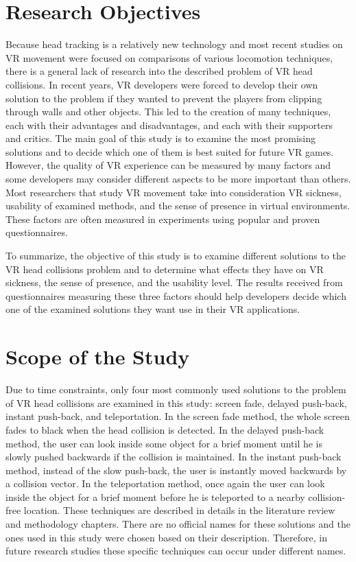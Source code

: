 \section{Research Objectives}

Because head tracking is a relatively new technology and most recent studies on VR movement were focused on comparisons of various locomotion techniques, there is a general lack of research into the described problem of VR head collisions. In recent years, VR developers were forced to develop their own solution to the problem if they wanted to prevent the players from clipping through walls and other objects. This led to the creation of many techniques, each with their advantages and disadvantages, and each with their supporters and critics. The main goal of this study is to examine the most promising solutions and to decide which one of them is best suited for future VR games. However, the quality of VR experience can be measured by many factors and some developers may consider different aspects to be more important than others. Most researchers that study VR movement take into consideration VR sickness, usability of examined methods, and the sense of presence in virtual environments. These factors are often measured in experiments using popular and proven questionnaires. 

To summarize, the objective of this study is to examine different solutions to the VR head collisions problem and to determine what effects they have on VR sickness, the sense of presence, and the usability level. The results received from questionnaires measuring these three factors should help developers decide which one of the examined solutions they want use in their VR applications.

\section{Scope of the Study}

Due to time constraints, only four most commonly used solutions to the problem of VR head collisions are examined in this study: screen fade, delayed push-back, instant push-back, and teleportation. In the screen fade method, the whole screen fades to black when the head collision is detected. In the delayed push-back method, the user can look inside some object for a brief moment until he is slowly pushed backwards if the collision is maintained. In the instant push-back method, instead of the slow push-back, the user is instantly moved backwards by a collision vector. In the teleportation method, once again the user can look inside the object for a brief moment before he is teleported to a nearby collision-free location. These techniques are described in details in the literature review and methodology chapters. There are no official names for these solutions and the ones used in this study were chosen based on their description. Therefore, in future research studies these specific techniques can occur under different names.

